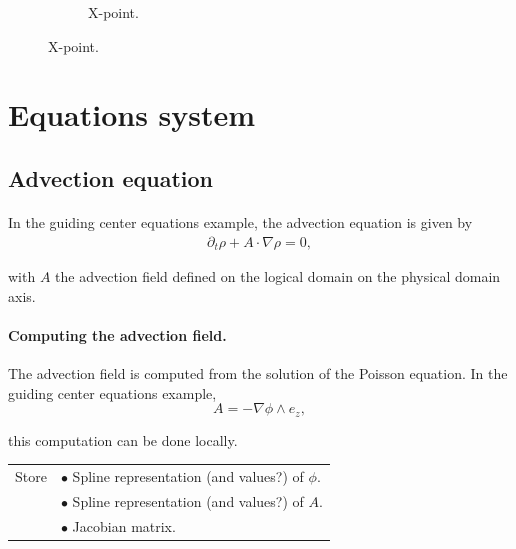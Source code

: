 \documentclass[presentation.tex]{subfiles}
\begin{document}
\begin{figure}[!h]
\begin{subfigure}{0.3333333\textwidth}
\caption{X-point.}
\end{subfigure}
\end{figure}


\section{Equations system}
\subsection{Advection equation}
\paragraph{}
In the guiding center equations example, the advection equation is given by 
\begin{equation}
\begin{aligned}
	\partial_t \rho + A\cdot\nabla \rho = 0,
\end{aligned}
\end{equation}

with $A$ the advection field defined on the logical domain on the physical domain axis. 


\paragraph{Computing the advection field.}
The advection field is computed from the solution of the Poisson equation. In the guiding center equations example,
\begin{equation}
	A = - \nabla \phi \wedge e_z,
\end{equation}

this computation can be done locally. 


\begin{center}
\begin{tabular}{ |l|l| } 
 \hline
 Store 	& $\bullet$ Spline representation (and values?) of $\phi$. \\
 		& $\bullet$ Spline representation (and values?) of $A$. \\
  		& $\bullet$ Jacobian matrix. \\
 \hline
\end{tabular}
\end{center}
\end{document}
